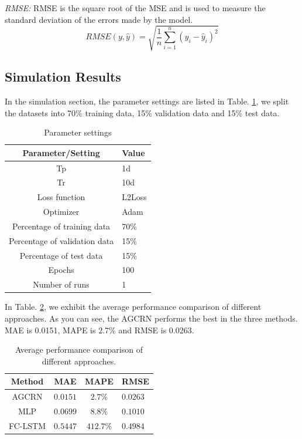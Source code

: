 \documentclass[sigconf, authordraft]{acmart}
\begin{document}
\emph{RMSE:} RMSE is the square root of the MSE and is used to measure the standard deviation of the errors made by the model.
$$
RMSE(y, \hat{y}) = \sqrt{\frac{1}{n} \sum_{i=1}^{n} (y_i - \hat{y}_i)^2}
$$
\subsection{Simulation Results}
In the simulation section, the parameter settings are listed in Table. \ref{Parameter settings }, we split the datasets into 70\% training data, 15\% validation data and 15\% test data. 

\begin{table}
		\caption{Parameter settings }
		\label{Parameter settings }
		\begin{tabular}{cl}
			\toprule Parameter/Setting & Value         \\
			\midrule Tp & 1d
           \\
			Tr & 10d    \\
			Loss function & L2Loss    \\
                Optimizer & Adam    \\
			Percentage of training data  & 70\%  \\
                Percentage of validation data & 15\%  \\
                Percentage of test data & 15\%    \\
                Epochs & 100    \\
                Number of runs & 1    \\
            \bottomrule
		\end{tabular}
	\end{table}

In Table. \ref{Average performance}, we exhibit the average performance comparison of different approaches.  As you can see, the AGCRN performs the best in the three methods.  MAE is 0.0151, MAPE is 2.7\% and RMSE is 0.0263.

\begin{table}
		\caption{Average performance comparison of different approaches.}
		\label{Average performance}
		\begin{tabular}{cccl}
			\toprule Method & MAE   & MAPE & RMSE          \\
			\midrule AGCRN               & $0.0151$ & $2.7\%$ & $0.0263$ \\
			MLP                       & $0.0699$ & $8.8\%$& $0.1010$    \\
			FC-LSTM                          & $0.5447$ & $412.7\%$& $0.4984$  \\
			
			\bottomrule
		\end{tabular}
	\end{table}
\end{document}

